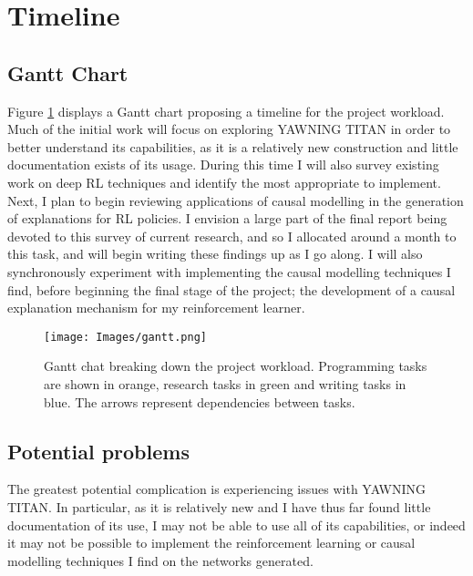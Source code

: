 \documentclass{article}
\begin{document}

\section{Timeline}

\subsection{Gantt Chart}
Figure \ref{fig:gantt} displays a Gantt chart proposing a timeline for the project workload. Much of the initial work will focus on exploring YAWNING TITAN in order to better understand its capabilities, as it is a relatively new construction and little documentation exists of its usage. During this time I will also survey existing work on deep RL techniques and identify the most appropriate to implement. Next, I plan to begin reviewing applications of causal modelling in the generation of explanations for RL policies. I envision a large part of the final report being devoted to this survey of current research, and so I allocated around a month to this task, and will begin writing these findings up as I go along. I will also synchronously experiment with implementing the causal modelling techniques I find, before beginning the final stage of the project; the development of a causal explanation mechanism for my reinforcement learner. 

\begin{figure}[htp]
    \centering
    \texttt{[image: Images/gantt.png]}
    \caption{Gantt chat breaking down the project workload. Programming tasks are shown in orange, research tasks in green and writing tasks in blue. The arrows represent dependencies between tasks.}
    \label{fig:gantt}
\end{figure}



\subsection{Potential problems}

The greatest potential complication is experiencing issues with YAWNING TITAN.  In particular, as it is relatively new and I have thus far found little documentation of its use, I may not be able to use all of its capabilities, or indeed it may not be possible to implement the reinforcement learning or causal modelling techniques I find on the networks generated. 
\end{document}
